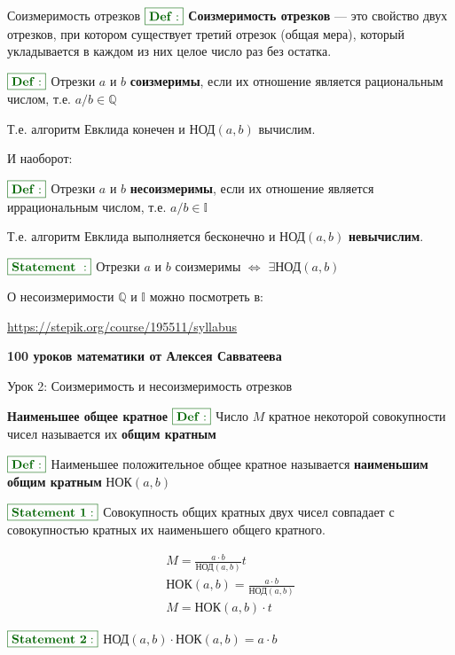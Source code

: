 \documentclass[8pt, aspectratio=169]{beamer}
\newcommand{\Def}{{\color{darkgreen}\boxed{\color{darkgreen}\mathbf{Def:}}}}
\newcommand{\St}[1]{{\color{darkgreen}\boxed{\color{darkgreen}\mathbf{Statement~#1:}}}}
\begin{document}
\begin{frame}{Соизмеримость отрезков}
$\Def$ \textbf{Соизмеримость отрезков} — это свойство двух отрезков, при котором существует третий отрезок (общая мера), который укладывается в каждом из них целое число раз без остатка.

\vspace{0.5cm}

$\Def$ Отрезки $a$ и $b$ \textbf{соизмеримы}, если их отношение является рациональным числом, т.е. $a/b \in \mathbb{Q}$

Т.е. алгоритм Евклида конечен и $\text{НОД}(a, b)$ вычислим.

\vspace{0.5cm}

И наоборот:

$\Def$ Отрезки $a$ и $b$ \textbf{несоизмеримы}, если их отношение является иррациональным числом, т.е. $a/b \in \mathbb{I}$

Т.е. алгоритм Евклида выполняется бесконечно и $\text{НОД}(a, b)$ \textbf{невычислим}.

\vspace{0.5cm}

$\St{}$
Отрезки $a$ и $b$ соизмеримы $\iff$ $\exists \text{НОД}(a, b)$

\vspace{0.5cm}

О несоизмеримости $\mathbb{Q}$ и $\mathbb{I}$ можно посмотреть в:

\url{https://stepik.org/course/195511/syllabus}

\textbf{100 уроков математики от Алексея Савватеева}

Урок 2: Соизмеримость и несоизмеримость отрезков

\end{frame}

\begin{frame}{\textbf{Наименьшее общее кратное}}
$\Def$ Число $M$ кратное некоторой совокупности чисел называется их \textbf{общим кратным}

$\Def$ Наименьшее положительное общее кратное называется \textbf{наименьшим общим кратным} $\text{НОК}(a, b)$

$\St{1}$ Совокупность общих кратных двух чисел совпадает с совокупностью кратных их наименьшего общего кратного.

\begin{gather*}
M = \frac{a\cdot b}{\text{НОД}(a, b)}t \\
\text{НОК}(a, b) = \frac{a\cdot b}{\text{НОД}(a, b)} \\
M = \text{НОК}(a, b) \cdot t
\end{gather*}

$\St{2}$ $\text{НОД}(a, b)\cdot \text{НОК}(a, b) = a \cdot b$

\end{frame}
\end{document}
